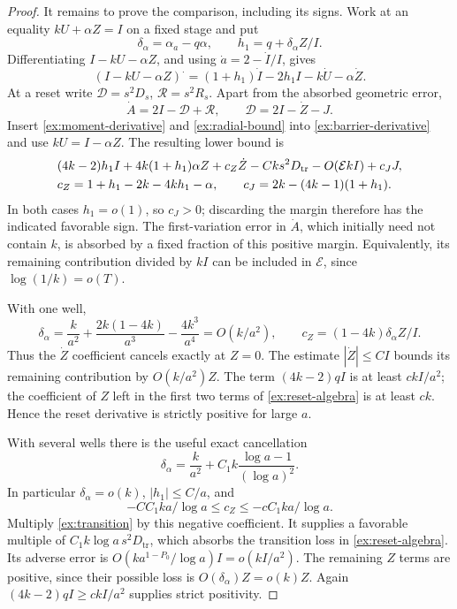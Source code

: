 \begin{proof}
It remains to prove the comparison, including its signs. Work at
an equality \(kU+\alpha Z=I\) on a fixed stage and put
\[
 \delta_\alpha=\alpha_a-q\alpha,\qquad
 h_1=q+\delta_\alpha Z/I.
\]
Differentiating \(I-kU-\alpha Z\), and using
\(\dot a=2-\dot I/I\), gives
\begin{equation}
 (I-kU-\alpha Z)^{\boldsymbol\cdot}
 =(1+h_1)\dot I-2h_1I-k\dot U-\alpha\dot Z.
 \label{ex:barrier-derivative}
\end{equation}
At a reset write \(\mathcal D=s^2D_s\),
\(\mathcal R=s^2R_s\). Apart from the absorbed geometric error,
\[
 \dot A=2I-\mathcal D+\mathcal R,\qquad
 \mathcal D=2I-\dot Z-J.
\]
Insert \eqref{ex:moment-derivative} and
\eqref{ex:radial-bound} into \eqref{ex:barrier-derivative} and
use \(kU=I-\alpha Z\). The resulting lower bound is
\begin{align}
 &(4k-2)h_1 I+4k(1+h_1)\alpha Z
    +c_Z\dot Z-Cks^2D_{\mathrm{tr}}-O(\mathcal E kI)
       +c_JJ,\label{ex:reset-algebra}\\
 &c_Z=1+h_1-2k-4kh_1-\alpha,\qquad
 c_J=2k-(4k-1)(1+h_1).\notag
\end{align}
In both cases \(h_1=o(1)\), so \(c_J>0\); discarding the
margin therefore has the indicated favorable sign. The first-variation
error in \(\dot A\), which initially need not contain \(k\), is
absorbed by a fixed fraction of this positive margin. Equivalently,
its remaining contribution divided by \(kI\) can be included in
\(\mathcal E\), since \(\log(1/k)=o(T)\).

With one well,
\[
 \delta_\alpha=\frac{k}{a^2}
       +\frac{2k(1-4k)}{a^3}-\frac{4k^3}{a^4}=O(k/a^2),\qquad
 c_Z=(1-4k)\delta_\alpha Z/I.
\]
Thus the \(\dot Z\) coefficient cancels exactly at \(Z=0\).
The estimate \(|\dot Z|\le CI\) bounds its remaining contribution
by \(O(k/a^2)Z\). The term \((4k-2)qI\) is at least
\(ckI/a^2\); the coefficient of \(Z\) left in the first two
terms of \eqref{ex:reset-algebra} is at least \(ck\).
Hence the reset derivative is strictly positive for large \(a\).

With several wells there is the useful exact cancellation
\[
 \delta_\alpha=\frac{k}{a^2}
       +C_1k\frac{\log a-1}{(\log a)^2}.
\]
In particular \(\delta_\alpha=o(k)\),
\(|h_1|\le C/a\), and
\[
 -C C_1ka/\log a\le c_Z\le-c C_1ka/\log a.
\]
Multiply \eqref{ex:transition} by this negative coefficient.
It supplies a favorable multiple of
\(C_1k\log a\,s^2D_{\mathrm{tr}}\), which absorbs the
transition loss in \eqref{ex:reset-algebra}. Its adverse error is
\(O(k a^{1-P_0}/\log a)I=o(kI/a^2)\). The remaining \(Z\)
terms are positive, since their possible loss is
\(O(\delta_\alpha)Z=o(k)Z\). Again
\((4k-2)qI\ge ckI/a^2\) supplies strict positivity.


\end{proof}
